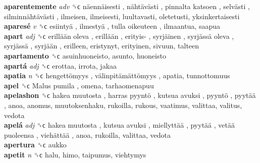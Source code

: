 \textbf{aparentemente} \emph{adv}  ␝ϲ   näennäisesti ,  nähtävästi ,  pinnalta katsoen ,  selvästi ,  silminnähtävästi , ilmeisen, ilmeisesti, luultavasti, oletetusti, yksinkertaisesti  \\
\textbf{aparesé} \emph{v}  ␝ϲ   esiintyä ,  ilmestyä ,  tulla oikeuteen , ilmaantua, saapua  \\
\textbf{apart} \emph{adj}  ␝ϲ   erillään oleva ,  erillään ,  erityis- ,  syrjäinen ,  syrjässä oleva ,  syrjässä ,  syrjään , erilleen, eristynyt, erityinen, sivuun, talteen  \\
\textbf{apartamento} ␝ϲ  asuinhuoneisto, asunto, huoneisto  \\
\textbf{apartá} \emph{adj}  ␝ϲ  erottaa, irrota, jakaa  \\
\textbf{apatia} \emph{n}  ␝ϲ   hengettömyys ,  välinpitämättömyys , apatia, tunnottomuus  \\
\textbf{apel} ␝ϲ   Malus pumila , omena, tarhaomenapuu  \\
\textbf{apelashon} ␝ϲ   hakea muutosta ,  harras pyyntö ,  kutsua avuksi ,  pyyntö ,  pyytää , anoa, anomus, muutoksenhaku, rukoilla, rukous, vaatimus, valittaa, valitus, vedota  \\
\textbf{apelá} \emph{adj}  ␝ϲ   hakea muutosta ,  kutsua avuksi ,  miellyttää ,  pyytää ,  vetää puoleensa ,  viehättää , anoa, rukoilla, valittaa, vedota  \\
\textbf{apertura} ␝ϲ  aukko  \\
\textbf{apetit} \emph{n}  ␝ϲ  halu, himo, taipumus, viehtymys  \\
